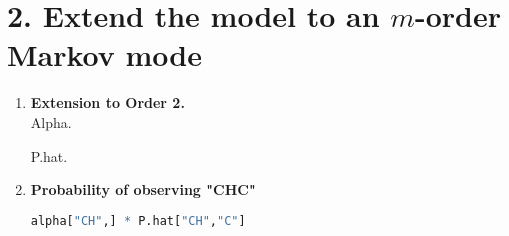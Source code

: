 \documentclass[12pt]{article}
\begin{document}
\newpage
\section*{2. Extend the model to an $m$-order Markov mode}
\begin{enumerate}[label = \textbf{\alph*.}]
  \item \textbf{Extension to Order 2.}\\
    Alpha.
    
    P.hat.
    
  \item \textbf{Probability of observing "CHC"}\\
    \begin{lstlisting}[language=R]
alpha["CH",] * P.hat["CH","C"]
    \end{lstlisting}
    
\end{enumerate}
\end{document}
